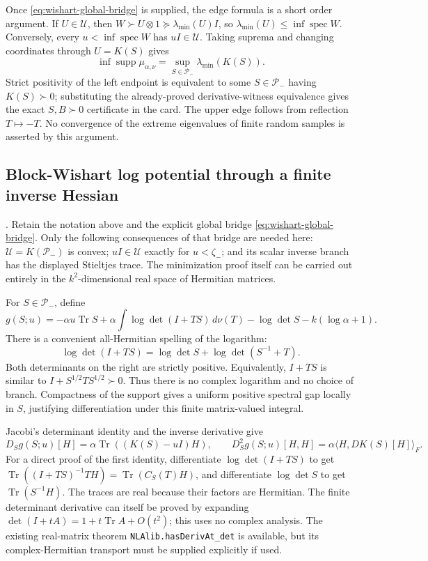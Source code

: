 \documentclass[11pt,a4paper]{article}
\DeclareRobustCommand{\code}[1]{{\footnotesize\urlstyle{tt}\nolinkurl{#1}}}
\begin{document}
Once \eqref{eq:wishart-global-bridge} is supplied, the edge formula is a
short order argument.  If \(U\in\mathcal U\), then
\(W\succ U\otimes1\succeq\lambda_{\min}(U)I\), so
\(\lambda_{\min}(U)\leq\inf\operatorname{spec}W\).
Conversely, every \(u<\inf\operatorname{spec}W\) has \(uI\in\mathcal U\).
Taking suprema and changing coordinates through \(U=K(S)\) gives
\[
 \inf\operatorname{supp}\mu_{\alpha,\nu}
   =\sup_{S\in\mathcal P_-}\lambda_{\min}(K(S)).
\]
Strict positivity of the left endpoint is equivalent to some \(S\in
\mathcal P_-\) having \(K(S)\succ0\); substituting the already-proved
derivative-witness equivalence gives the exact \(S,B\succ0\) certificate
in the card.  The upper edge follows from reflection \(T\mapsto-T\).
No convergence of the extreme eigenvalues of finite random samples is
asserted by this argument.

\subsection{Block-Wishart log potential through a finite inverse Hessian}
\label{route:block-wishart-log-potential}
\noindent\code{block-wishart-log-potential}.
Retain the notation above and the explicit global bridge
\eqref{eq:wishart-global-bridge}.  Only the following consequences of that
bridge are needed here: \(\mathcal U=K(\mathcal P_-)\) is convex;
\(uI\in\mathcal U\) exactly for \(u<\zeta_-\); and its scalar inverse branch
has the displayed Stieltjes trace.  The minimization proof itself can be
carried out entirely in the \(k^2\)-dimensional real space of Hermitian
matrices.

For \(S\in\mathcal P_-\), define
\[
 g(S;u)=-\alpha u\operatorname{Tr}S
       +\alpha\int\log\det(I+TS)\,d\nu(T)
       -\log\det S-k(\log\alpha+1).
\]
There is a convenient all-Hermitian spelling of the logarithm:
\begin{equation}
 \log\det(I+TS)=\log\det S+\log\det(S^{-1}+T).
 \label{eq:wishart-log-hermitian}
\end{equation}
Both determinants on the right are strictly positive.  Equivalently,
\(I+TS\) is similar to \(I+S^{1/2}TS^{1/2}\succ0\).  Thus there is no
complex logarithm and no choice of branch.  Compactness of the support
gives a uniform positive spectral gap locally in \(S\), justifying
differentiation under this finite matrix-valued integral.

Jacobi's determinant identity and the inverse derivative give
\begin{equation}
 D_Sg(S;u)[H]=\alpha\operatorname{Tr}((K(S)-uI)H),
 \qquad D_S^2g(S;u)[H,H]=\alpha\langle H,DK(S)[H]\rangle_F.
 \label{eq:wishart-gradient}
\end{equation}
For a direct proof of the first identity, differentiate
\(\log\det(I+TS)\) to get
\(\operatorname{Tr}((I+TS)^{-1}TH)=\operatorname{Tr}(C_S(T)H)\), and
differentiate \(\log\det S\) to get \(\operatorname{Tr}(S^{-1}H)\).
The traces are real because their factors are Hermitian.
The finite determinant derivative can itself be proved by expanding
\(\det(I+tA)=1+t\operatorname{Tr}A+O(t^2)\); this uses no complex analysis.
The existing real-matrix theorem \code{NLAlib.hasDerivAt_det} is available,
but its complex-Hermitian transport must be supplied explicitly if used.
\end{document}

